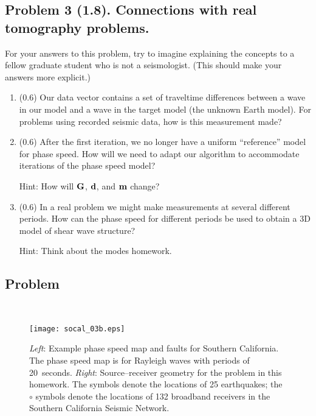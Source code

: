 \documentclass[11pt,titlepage,fleqn]{article}
\begin{document}

\pagebreak
\subsection*{Problem 3 (1.8). Connections with real tomography problems.}

For your answers to this problem, try to imagine explaining the concepts to a fellow graduate student who is not a seismologist. (This should make your answers more explicit.)

\begin{enumerate}
\item (0.6) Our data vector contains a set of traveltime differences between a wave in our model and a wave in the target model (\ie the unknown Earth model). For problems using recorded seismic data, how is this measurement made?

\item (0.6) After the first iteration, we no longer have a uniform ``reference'' model for phase speed. How will we need to adapt our algorithm to accommodate iterations of the phase speed model?

Hint: How will $\mbox{${\bf G}$}$, $\mbox{${\bf d}$}$, and $\mbox{${\bf m}$}$ change?

\item (0.6) In a real problem we might make measurements at several different periods. How can the phase speed for different periods be used to obtain a 3D model of shear wave structure?

Hint: Think about the modes homework.

\end{enumerate}


\subsection*{Problem} \howmuchtime\




\clearpage\pagebreak

\begin{figure}
\hspace{-0.5cm}
\texttt{[image: socal\_03b.eps]}
\caption[Source--receiver geometry for southern California]
{{
{\em Left}: Example phase speed map and faults for Southern California. The phase speed map is for Rayleigh waves with periods of 20~seconds.
{\em Right}: Source--receiver geometry for the problem in this homework. The  symbols denote the locations of 25 earthquakes; the $\circ$ symbols denote the locations of 132 broadband receivers in the Southern California Seismic Network.
\label{fig:geometry}
}}
\end{figure}
\end{document}
